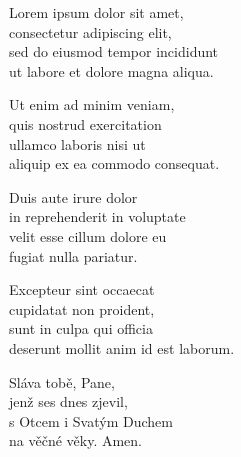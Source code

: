 %
%
%

\begin{translatioMulticol}{5}
Lorem ipsum dolor sit amet,\\
consectetur adipiscing elit,\\
sed do eiusmod tempor incididunt\\
ut labore et dolore magna aliqua.\columnbreak

Ut enim ad minim veniam,\\
quis nostrud exercitation\\
ullamco laboris nisi ut\\
aliquip ex ea commodo consequat.\columnbreak

Duis aute irure dolor\\
in reprehenderit in voluptate\\
velit esse cillum dolore eu\\
fugiat nulla pariatur.\columnbreak

Excepteur sint occaecat\\
cupidatat non proident,\\
sunt in culpa qui officia\\
deserunt mollit anim id est laborum.\columnbreak

Sláva tobě, Pane,\\
jenž ses dnes zjevil,\\
s Otcem i Svatým Duchem\\
na věčné věky.
Amen.
\end{translatioMulticol}
